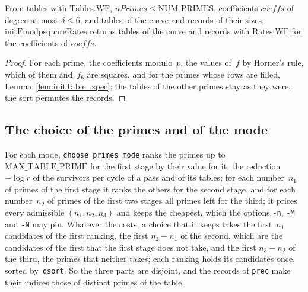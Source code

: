 \begin{lemma}\label{lem:initFmodpsquareRates_spec}
  \leanok
  From tables with $\mathrm{Tables.WF}$, $\mathit{nPrimes} \le \mathrm{NUM\_PRIMES}$,
  coefficients $\mathit{coeffs}$ of degree at most $\delta \le 6$, and tables of the curve and
  records of their sizes, $\mathrm{initFmodpsquareRates}$ returns tables of the curve and
  records with $\mathrm{Rates.WF}$ for the coefficients of $\mathit{coeffs}$.
\end{lemma}

\begin{proof}
  \leanok
  For each prime, the coefficients modulo~$p$, the values of~$f$ by Horner's rule, which of them
  and~$f_6$ are squares, and for the primes whose rows are filled, Lemma~\ref{lem:initTable_spec};
  the tables of the other primes stay as they were; the sort permutes the records.
\end{proof}

\subsection{The choice of the primes and of the mode}

For each mode, \texttt{choose\_primes\_mode} ranks the primes up to $\mathrm{MAX\_TABLE\_PRIME}$ for
the first stage by their value for it, the reduction $-\log r$ of the survivors per cycle of a pass
and of its tables; for each number~$n_1$ of primes of the first stage it ranks the others for the
second stage, and for each number~$n_2$ of primes of the first two stages all primes left for the
third; it prices every admissible $(n_1, n_2, n_3)$ and keeps the cheapest, which the options
\texttt{-n}, \texttt{-M} and \texttt{-N} may pin. Whatever the costs, a choice that it keeps takes
the first~$n_1$ candidates of the first ranking, the first $n_2 - n_1$ of the second, which are the
candidates of the first that the first stage does not take, and the first $n_3 - n_2$ of the third,
the primes that neither takes; each ranking holds its candidates once, sorted by~\texttt{qsort}. So
the three parts are disjoint, and the records of \texttt{prec} make their indices those of distinct
primes of the table.

